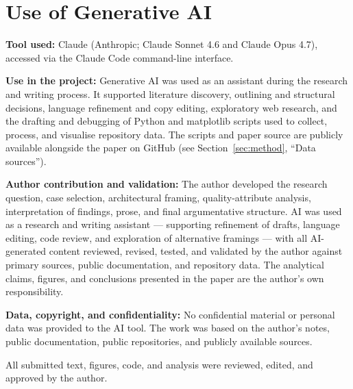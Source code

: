 \documentclass[11pt,a4paper]{article}
\begin{document}
\section*{Use of Generative AI}

\textbf{Tool used:} Claude (Anthropic; Claude Sonnet 4.6 and Claude Opus 4.7), accessed via the Claude Code command-line interface.

\textbf{Use in the project:} Generative AI was used as an assistant during the research and writing process. It supported literature discovery, outlining and structural decisions, language refinement and copy editing, exploratory web research, and the drafting and debugging of Python and matplotlib scripts used to collect, process, and visualise repository data. The scripts and paper source are publicly available alongside the paper on GitHub (see Section~\ref{sec:method}, ``Data sources'').

\textbf{Author contribution and validation:} The author developed the research question, case selection, architectural framing, quality-attribute analysis, interpretation of findings, prose, and final argumentative structure. AI was used as a research and writing assistant --- supporting refinement of drafts, language editing, code review, and exploration of alternative framings --- with all AI-generated content reviewed, revised, tested, and validated by the author against primary sources, public documentation, and repository data. The analytical claims, figures, and conclusions presented in the paper are the author's own responsibility.

\textbf{Data, copyright, and confidentiality:} No confidential material or personal data was provided to the AI tool. The work was based on the author's notes, public documentation, public repositories, and publicly available sources.

All submitted text, figures, code, and analysis were reviewed, edited, and approved by the author.


\end{document}
